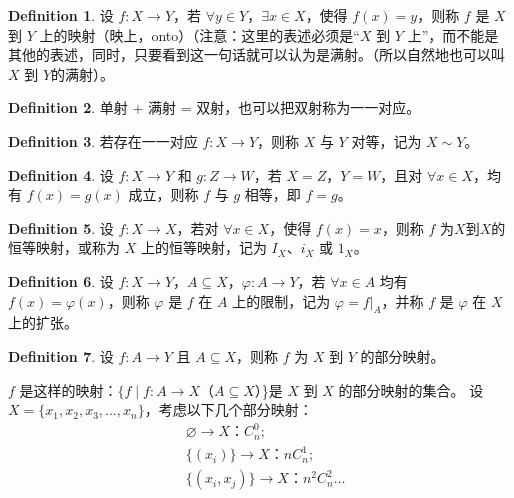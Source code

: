 \documentclass[oneside]{book}
\theoremstyle{definition}
\newtheorem{definition}{Definition}[section]
\begin{document}
	\begin{definition}
		设 \( f: X \to Y \)，若 \( \forall y \in Y \)，\( \exists x \in X \)，使得 \( f(x) = y \)，则称 \( f \) 是 \( X \) 到 \( Y \) 上的映射（映上，onto）（注意：这里的表述必须是“\( X \) 到 \( Y \) 上”，而不能是其他的表述，同时，只要看到这一句话就可以认为是满射。（所以自然地也可以叫\( X \) 到 \( Y \)的满射）。
	\end{definition}
	
	\begin{definition}
		单射 + 满射 = 双射，也可以把双射称为一一对应。
	\end{definition}
	
	\begin{definition}
		若存在一一对应 \( f: X \to Y \)，则称 \( X \) 与 \( Y \) 对等，记为 \( X \sim Y \)。
	\end{definition}
	
	\begin{definition}
		设 \( f: X \to Y \) 和 \( g: Z \to W \)，若 \( X = Z \)，\( Y = W \)，且对 \( \forall x \in X \)，均有 \( f(x) = g(x) \) 成立，则称 \( f \) 与 \( g \) 相等，即 \( f = g \)。
	\end{definition}
	
	\begin{definition}
		设 \( f: X \to X \)，若对 \( \forall x \in X \)，使得 \( f(x) = x \)，则称 \( f \) 为\( X \)到\( X \)的恒等映射，或称为 \( X \) 上的恒等映射，记为 \( I_X \)、\( i_X \) 或 \( 1_X \)。
	\end{definition}
	
	\begin{definition}
		设 \( f: X \to Y \)，\( A \subseteq X \)，\( \varphi: A \to Y \)，若 \( \forall x \in A \) 均有 \( f(x) = \varphi(x) \)，则称 \( \varphi \) 是 \( f \) 在 \( A \) 上的限制，记为 \( \varphi = f|_A \)，并称 \( f \) 是 \( \varphi \) 在 \( X \) 上的扩张。
	\end{definition}
	
	\begin{definition}
		设 \( f: A \to Y \) 且 \( A \subseteq X \)，则称 \( f \) 为 \( X \) 到 \( Y \) 的部分映射。
	\end{definition}
	 \( f \) 是这样的映射：\( \{ f \mid f: A \to X \)（\( A \subseteq X    \)）\}是 \( X \) 到 \( X \) 的部分映射的集合。
	设 \( X = \{ x_1, x_2, x_3, \dots, x_n \} \)，考虑以下几个部分映射：
	\[
	\begin{aligned}
		& \varnothing \to X \text{：} C_n^0; \\
		& \{ (x_i) \} \to X\text{：} nC_n^1; \\
		& \{ (x_i, x_j) \} \to X\text{：} n^2C_n^2 \dots
	\end{aligned}
	\]
	
\end{document}
